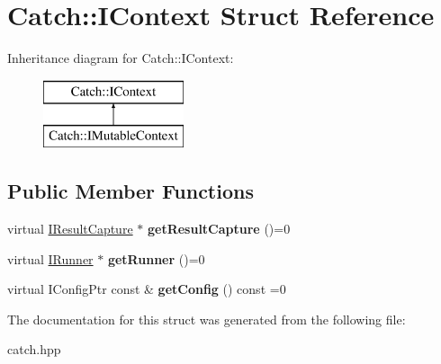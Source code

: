 \hypertarget{structCatch_1_1IContext}{}\section{Catch\+::I\+Context Struct Reference}
\label{structCatch_1_1IContext}
Inheritance diagram for Catch\+::I\+Context\+:\begin{figure}[H]
\begin{center}
\leavevmode
\includegraphics[height=2.000000cm]{structCatch_1_1IContext}
\end{center}
\end{figure}
\subsection*{Public Member Functions}
\begin{DoxyCompactItemize}
\item 
\mbox{\label{structCatch_1_1IContext_a684e4ae71d1fdf3060c352ecde1d122f}} 
virtual \mbox{\hyperlink{structCatch_1_1IResultCapture}{I\+Result\+Capture}} $\ast$ {\bfseries get\+Result\+Capture} ()=0
\item 
\mbox{\label{structCatch_1_1IContext_af088415dde18d039ed5a2f95b02767c6}} 
virtual \mbox{\hyperlink{structCatch_1_1IRunner}{I\+Runner}} $\ast$ {\bfseries get\+Runner} ()=0
\item 
\mbox{\label{structCatch_1_1IContext_a72a2718232adea8925fec9e71d3efd75}} 
virtual I\+Config\+Ptr const  \& {\bfseries get\+Config} () const =0
\end{DoxyCompactItemize}


The documentation for this struct was generated from the following file\+:\begin{DoxyCompactItemize}
\item 
catch.\+hpp\end{DoxyCompactItemize}
